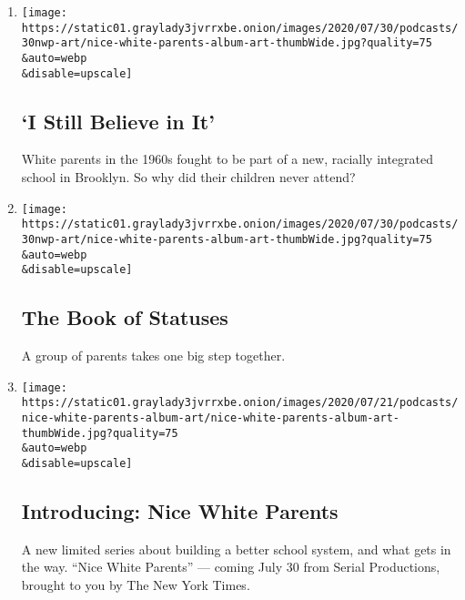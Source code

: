 \begin{enumerate}
\def\labelenumi{\arabic{enumi}.}
\item
  \href{/2020/07/30/podcasts/nice-white-parents-serial-2.html}{}

  \texttt{[image: https://static01.graylady3jvrrxbe.onion/images/2020/07/30/podcasts/30nwp-art/nice-white-parents-album-art-thumbWide.jpg?quality=75\\\&auto=webp\\\&disable=upscale]}

  \hypertarget{i-still-believe-in-it}{%
  \subsection{`I Still Believe in It'}\label{i-still-believe-in-it}}

  White parents in the 1960s fought to be part of a new, racially
  integrated school in Brooklyn. So why did their children never attend?
\item
  \href{/2020/07/30/podcasts/nice-white-parents-serial.html}{}

  \texttt{[image: https://static01.graylady3jvrrxbe.onion/images/2020/07/30/podcasts/30nwp-art/nice-white-parents-album-art-thumbWide.jpg?quality=75\\\&auto=webp\\\&disable=upscale]}

  \hypertarget{the-book-of-statuses}{%
  \subsection{The Book of Statuses}\label{the-book-of-statuses}}

  A group of parents takes one big step together.
\item
  \href{/2020/07/23/podcasts/nice-white-parents-serial.html}{}

  \texttt{[image: https://static01.graylady3jvrrxbe.onion/images/2020/07/21/podcasts/nice-white-parents-album-art/nice-white-parents-album-art-thumbWide.jpg?quality=75\\\&auto=webp\\\&disable=upscale]}

  \hypertarget{introducing-nice-white-parents}{%
  \subsection{Introducing: Nice White
  Parents}\label{introducing-nice-white-parents}}

  A new limited series about building a better school system, and what
  gets in the way. ``Nice White Parents'' --- coming July 30 from Serial
  Productions, brought to you by The New York Times.
\end{enumerate}

